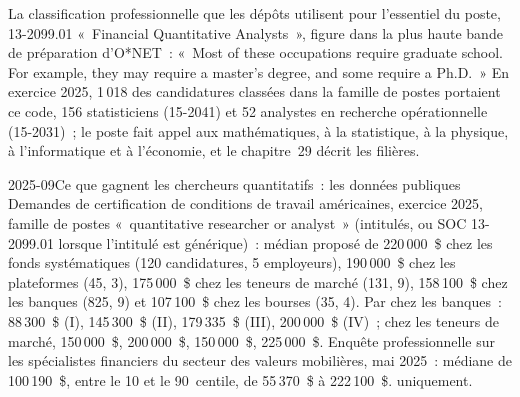 La classification professionnelle que les dépôts utilisent pour l'essentiel du poste, 13-2099.01 «~Financial Quantitative
Analysts~», figure dans la plus haute bande de préparation d'O*NET~: «~Most of these occupations require graduate
school. For example, they may require a master's degree, and some require a Ph.D.~» En exercice 2025, 1\,018 des
candidatures classées dans la famille de postes portaient ce code, 156 statisticiens (15-2041) et 52 analystes en recherche
opérationnelle (15-2031)~; le poste fait appel aux mathématiques, à la statistique, à la physique, à l'informatique et à l'économie, et le chapitre~29
décrit les filières.

\begin{dated}{2025-09}{Ce que gagnent les chercheurs quantitatifs~: les données publiques}\label{dat:in:quant-researcher:pay}
Demandes de certification de conditions de travail américaines, exercice 2025, famille de postes «~quantitative researcher or analyst~» (intitulés, ou SOC
13-2099.01 lorsque l'intitulé est générique)~:  médian proposé de 220\,000~\$ chez les fonds systématiques (120 candidatures, 5 employeurs),
190\,000~\$ chez les plateformes (45, 3), 175\,000~\$ chez les teneurs de marché (131, 9), 158\,100~\$ chez les banques (825, 9) et 107\,100~\$ chez les
bourses (35, 4). Par  chez les banques~: 88\,300~\$ (I), 145\,300~\$ (II), 179\,335~\$ (III), 200\,000~\$ (IV)~; chez les
teneurs de marché, 150\,000~\$, 200\,000~\$, 150\,000~\$, 225\,000~\$. Enquête professionnelle sur les spécialistes financiers du
secteur des valeurs mobilières, mai 2025~: médiane de 100\,190~\$, entre le 10 et le 90~centile, de 55\,370~\$ à 222\,100~\$.  uniquement.
\end{dated}

